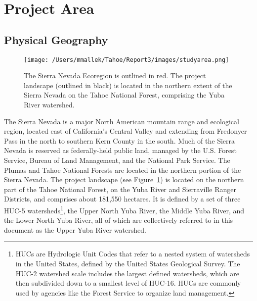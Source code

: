 \section{Project Area}

\subsection{Physical Geography}

\begin{figure}[!htbp]
\texttt{[image: /Users/mmallek/Tahoe/Report3/images/studyarea.png]}
\caption{The Sierra Nevada Ecoregion is outlined in red. The project landscape (outlined in black) is located in the northern extent of the Sierra Nevada on the Tahoe National Forest, comprising the Yuba River watershed.}
\label{projectarea}
\end{figure}

The Sierra Nevada is a major North American mountain range and ecological region, located east of California's Central Valley and extending from Fredonyer Pass in the north to southern Kern County in the south. Much of the Sierra Nevada is reserved as federally-held public land, managed by the U.S. Forest Service, Bureau of Land Management, and the National Park Service. The Plumas and Tahoe National Forests are located in the northern portion of the Sierra Nevada. The project landscape (see Figure~\ref{projectarea}) is located on the northern part of the Tahoe National Forest, on the Yuba River and Sierraville Ranger Districts, and comprises about 181,550 hectares. It is defined by a set of three HUC-5 watersheds\footnote{HUCs are Hydrologic Unit Codes that refer to a nested system of watersheds in the United States, defined by the United States Geological Survey. The HUC-2 watershed scale includes the largest defined watersheds, which are then subdivided down to a smallest level of HUC-16. HUCs are commonly used by agencies like the Forest Service to organize land management.}, the Upper North Yuba River, the Middle Yuba River, and the Lower North Yuba River, all of which are collectively referred to in this document as the Upper Yuba River watershed. 

